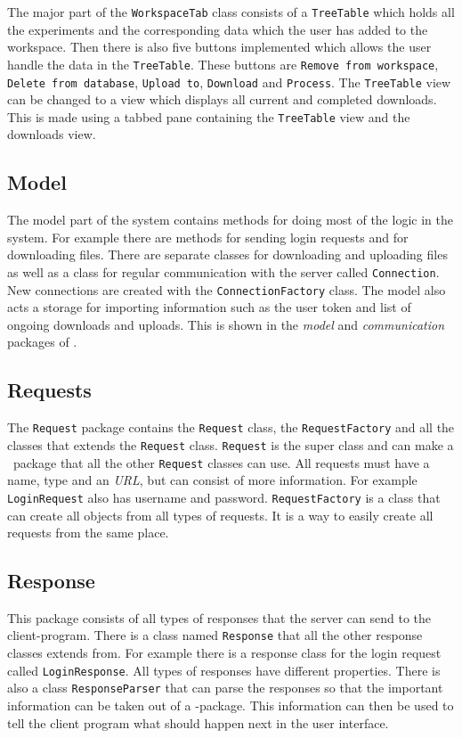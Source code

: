 The major part of the \texttt{WorkspaceTab} class consists of a \texttt{TreeTable} which holds all the experiments and the corresponding data which the user has added to the workspace. Then there is also five buttons implemented which allows the user handle the data in the \texttt{TreeTable}. These buttons are \texttt{Remove from workspace}, \texttt{Delete from database}, \texttt{Upload to}, \texttt{Download} and \texttt{Process}. The \texttt{TreeTable} view can be changed to a view which displays all current and completed downloads. This is made using a tabbed pane containing the \texttt{TreeTable} view and the downloads view.

\subsection{Model}
The model part of the system contains methods for doing most of the logic in the system. For example there are methods for sending login requests and for downloading files. There are separate classes for downloading and uploading files as well as a class for regular communication with the server called \texttt{Connection}. New connections are created with the \texttt{ConnectionFactory} class. The model also acts a storage for importing information such as the user token and list of ongoing downloads and uploads. This is shown in the \textit{model} and \textit{communication} packages of .

\subsection{Requests}
The \texttt{Request} package contains the \texttt{Request} class, the \texttt{RequestFactory} and all the classes that extends the \texttt{Request} class. \texttt{Request} is the super class and can make a \json\ package that all the other \texttt{Request} classes can use. All requests must have a name, type and an \textit{URL}, but can consist of more information. For example \texttt{LoginRequest} also has username and password. \texttt{RequestFactory} is a class that can create all objects from all types of requests. It is a way to easily create all requests from the same place.


\subsection{Response}
This package consists of all types of responses that the server can send to the client-program. There is a class named \texttt{Response} that all the other response classes extends from. For example there is a response class for the login request called \texttt{LoginResponse}. All types of responses have different properties. There is also a class \texttt{ResponseParser} that can parse the responses so that the important information can be taken out of a \json -package. This information can then be used to tell the client program what should happen next in the user interface.


